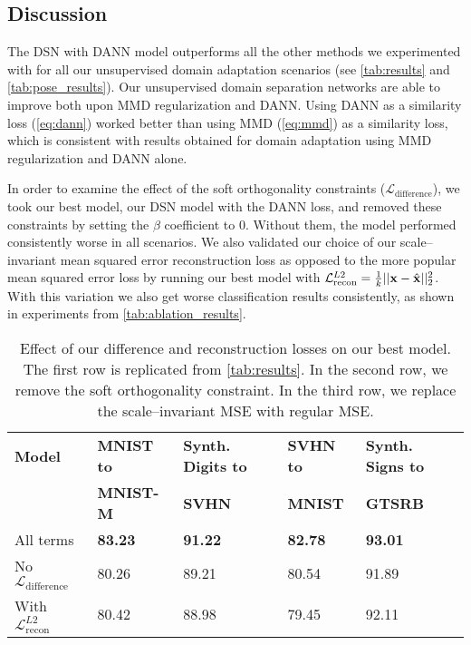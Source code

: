 \documentclass{article}
\begin{document}
\subsection{Discussion}
\label{sec:discussion}
 The DSN with DANN model outperforms all the other methods we experimented with for all our unsupervised domain adaptation scenarios (see \autoref{tab:results} and \ref{tab:pose_results}). Our unsupervised domain separation networks are able to improve both upon MMD regularization and DANN.  Using DANN as a similarity loss (\autoref{eq:dann}) worked better than using MMD (\autoref{eq:mmd}) as a similarity loss, which is consistent with results obtained for domain adaptation using MMD regularization and DANN alone.


In order to examine the effect of the soft orthogonality constraints ($\mathcal{L}_\mathrm{difference}$), we took our best model, our DSN model with the DANN loss, and removed these constraints by setting the $\beta$ coefficient to $0$. Without them, the model performed consistently worse in all scenarios.
We also validated our choice of our scale--invariant mean squared error reconstruction loss as opposed to the more popular mean squared error loss by running our best model with $\mathcal{L}_\mathrm{recon}^{{L2}}=\frac{1}{k}||{\bf x}-\hat{{\bf x}}||_2^2$. With this variation we also get worse classification results consistently, as shown in experiments from \autoref{tab:ablation_results}.
\begin{table}[t]
\centering
\caption{Effect of our difference and reconstruction losses on our best model. The first row is replicated from \autoref{tab:results}. In the second row, we remove the soft orthogonality constraint. In the third row, we replace the scale--invariant MSE with regular MSE.}
\vspace{2mm}
\label{tab:ablation_results}
\begin{tabular}{ | l | l | l | l | l | }
\hline
\bf Model   & \bf MNIST to & \bf Synth. Digits to & \bf SVHN to  & \bf Synth. Signs to \\
 & \bf MNIST-M  & \bf SVHN        & \bf MNIST & \bf GTSRB\\ \hline \hline
All terms  & \textbf{83.23} & \textbf{91.22} & \textbf{82.78} & \textbf{93.01} \\ \hline 
No $\mathcal{L}_\mathrm{difference}$ & 80.26 & 89.21 &  80.54 & 91.89\\ \hline
With $\mathcal{L}_\mathrm{recon}^{L2}$ & 80.42 & 88.98 &  79.45 & 92.11\\ \hline
\end{tabular}
\end{table}
\end{document}
